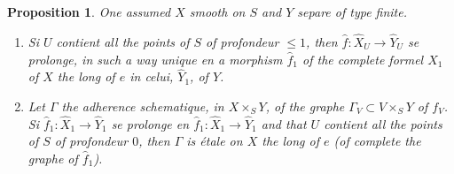 \documentclass[12pt,a4paper]{article}
\theoremstyle{plain}
\newtheorem{proposition}[theorem]{Proposition}
\theoremstyle{definition}
\theoremstyle{remark}
\begin{document}
\begin{proposition}
One assumed $X$ smooth on $S$ and $Y$ separe of type finite.

\begin{enumerate}[label=(\roman*)]
\item Si $U$ contient all the points of $S$ of profondeur $\leq 1$, then $\hat{f} : \hat{X}_U \to \hat{Y}_U$ se prolonge, in such a way unique en a morphism $\hat{f}_1$ of the complete formel $\hat{X}_1$ of $X$ the long of $e$ in celui, $\hat{Y}_1$, of $Y$.
\item Let $\Gamma$ the adherence schematique, in $X \times_S Y$, of the graphe $\Gamma_V \subset V \times_S Y$ of $f_V$. Si $\hat{f}_1 : \hat{X}_1 \to \hat{Y}_1$ se prolonge en $\hat{f}_1 : \hat{X}_1 \to \hat{Y}_1$ and that $U$ contient all the points of $S$ of profondeur $0$, then $\Gamma$ is étale on $X$ the long of $e$ (of complete the graphe of $\hat{f}_1$).
\end{enumerate}
\end{proposition}
\end{document}
